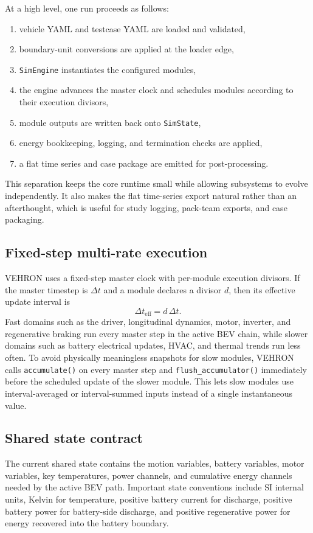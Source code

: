 \documentclass[11pt,a4paper]{article}
\begin{document}
At a high level, one run proceeds as follows:
\begin{enumerate}
\item vehicle YAML and testcase YAML are loaded and validated,
\item boundary-unit conversions are applied at the loader edge,
\item \texttt{SimEngine} instantiates the configured modules,
\item the engine advances the master clock and schedules modules according to their execution divisors,
\item module outputs are written back onto \texttt{SimState},
\item energy bookkeeping, logging, and termination checks are applied,
\item a flat time series and case package are emitted for post-processing.
\end{enumerate}

This separation keeps the core runtime small while allowing subsystems to evolve independently. It also makes the flat time-series export natural rather than an afterthought, which is useful for study logging, pack-team exports, and case packaging.

\subsection{Fixed-step multi-rate execution}
VEHRON uses a fixed-step master clock with per-module execution divisors. If the master timestep is $\Delta t$ and a module declares a divisor $d$, then its effective update interval is
\begin{equation}
\Delta t_{\mathrm{eff}} = d \, \Delta t.
\end{equation}
Fast domains such as the driver, longitudinal dynamics, motor, inverter, and regenerative braking run every master step in the active BEV chain, while slower domains such as battery electrical updates, HVAC, and thermal trends run less often. To avoid physically meaningless snapshots for slow modules, VEHRON calls \texttt{accumulate()} on every master step and \texttt{flush\_accumulator()} immediately before the scheduled update of the slower module. This lets slow modules use interval-averaged or interval-summed inputs instead of a single instantaneous value.

\subsection{Shared state contract}
The current shared state contains the motion variables, battery variables, motor variables, key temperatures, power channels, and cumulative energy channels needed by the active BEV path. Important state conventions include SI internal units, Kelvin for temperature, positive battery current for discharge, positive battery power for battery-side discharge, and positive regenerative power for energy recovered into the battery boundary.
\end{document}
